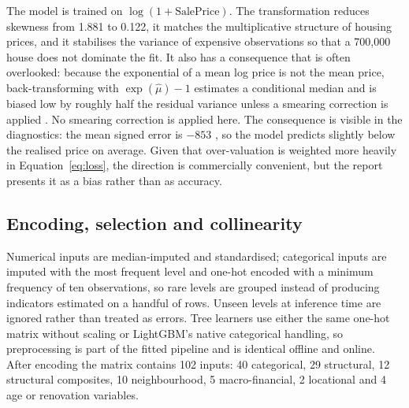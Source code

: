 The model is trained on $\log(1 + \text{SalePrice})$. The transformation reduces
skewness from 1.881 to 0.122, it matches the multiplicative structure of housing
prices, and it stabilises the variance of expensive observations so that a 700,000
\USD{} house does not dominate the fit. It also has a consequence that is often
overlooked: because the exponential of a mean log price is not the mean price,
back-transforming with $\exp(\hat{\mu}) - 1$ estimates a conditional median and is
biased low by roughly half the residual variance unless a smearing correction is
applied \citep{hastie2009esl}. No smearing correction is applied here. The
consequence is visible in the diagnostics: the mean signed error is $-853$ \USD, so
the model predicts slightly below the realised price on average. Given that
over-valuation is weighted more heavily in Equation~\eqref{eq:loss}, the direction is
commercially convenient, but the report presents it as a bias rather than as
accuracy.

\subsection{Encoding, selection and collinearity}

Numerical inputs are median-imputed and standardised; categorical inputs are imputed
with the most frequent level and one-hot encoded with a minimum frequency of ten
observations, so rare levels are grouped instead of producing indicators estimated on
a handful of rows. Unseen levels at inference time are ignored rather than treated as
errors. Tree learners use either the same one-hot matrix without scaling or
LightGBM's native categorical handling, so preprocessing is part of the fitted
pipeline and is identical offline and online. After encoding the matrix contains 102
inputs: 40 categorical, 29 structural, 12 structural composites, 10 neighbourhood, 5
macro-financial, 2 locational and 4 age or renovation variables.


